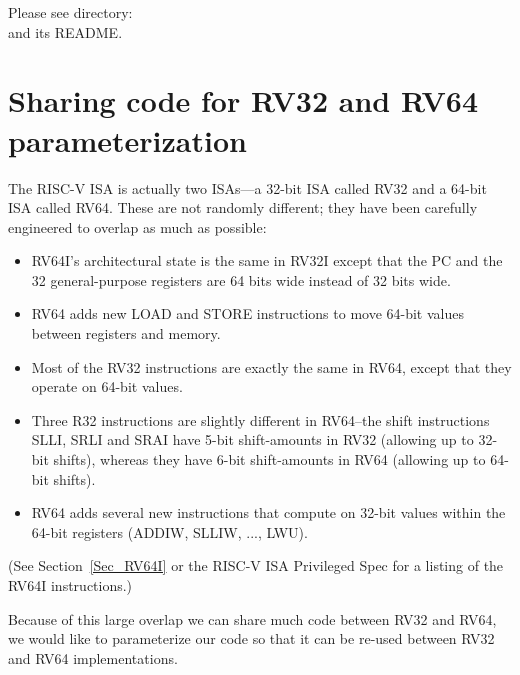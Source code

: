 Please see directory:  \\
and its README.
\Endexercise


\section{Sharing code for RV32 and RV64 {\via} parameterization}

\label{BSV_Paramterizing_XLEN}


The RISC-V ISA is actually two ISAs---a 32-bit ISA called RV32 and a
64-bit ISA called RV64.  These are not randomly different; they have
been carefully engineered to overlap as much as possible:

\begin{itemize}

 \item RV64I's architectural state is the same in RV32I except that
       the PC and the 32 general-purpose registers are 64 bits wide
       instead of 32 bits wide.

 \item RV64 adds new LOAD and STORE instructions to move 64-bit values
       between registers and memory.

 \item Most of the RV32 instructions are exactly the same in RV64,
       except that they operate on 64-bit values.


 \item Three R32 instructions are slightly different in RV64--the
       shift instructions SLLI, SRLI and SRAI have 5-bit shift-amounts
       in RV32 (allowing up to 32-bit shifts), whereas they have 6-bit
       shift-amounts in RV64 (allowing up to 64-bit shifts).

 \item RV64 adds several new instructions that compute on 32-bit
       values within the 64-bit registers (ADDIW, SLLIW, ..., LWU).

\end{itemize}

(See Section~\ref{Sec_RV64I} or the RISC-V ISA Privileged Spec for a
listing of the RV64I instructions.)

Because of this large overlap we can share much {\BSV} code between
RV32 and RV64, {\ie} we would like to parameterize our {\BSV} code so
that it can be re-used between RV32 and RV64 implementations.

